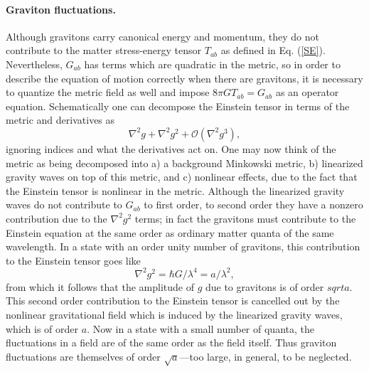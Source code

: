 \documentclass{article}
\begin{document}
\paragraph{\textbf{Graviton fluctuations.}}  Although gravitons carry canonical energy and momentum, they do not contribute to the matter stress-energy tensor $T_{ab}$ as defined in Eq. (\ref{SE}).  Nevertheless, $G_{ab}$ has terms which are quadratic in the metric, so in order to describe the equation of motion correctly when there are gravitons, it is necessary to quantize the metric field as well and impose $8\pi G T_{ab} = G_{ab}$ as an operator equation.  Schematically one can decompose the Einstein tensor in terms of the metric and derivatives as
\begin{equation}
\nabla^2 g + \nabla^2 g^2 + \mathcal{O}(\nabla^2 g^3),
\end{equation}
ignoring indices and what the derivatives act on.  One may now think of the metric as being decomposed into a) a background Minkowski metric, b) linearized gravity waves on top of this metric, and c) nonlinear effects, due to the fact that the Einstein tensor is nonlinear in the metric.  Although the linearized gravity waves do not contribute to $G_{ab}$ to first order, to second order they have a nonzero contribution due to the $\nabla^2 g^2$ terms; in fact the gravitons must contribute to the Einstein equation at the same order as ordinary matter quanta of the same wavelength.  In a state with an order unity number of gravitons, this contribution to the Einstein tensor goes like
\begin{equation}
\nabla^2 g^2 = \hbar G / \lambda^4 = a / \lambda^2,
\end{equation}
from which it follows that the amplitude of $g$ due to gravitons is of order $sqrt{a}$.  This second order contribution to the Einstein tensor is cancelled out by the nonlinear gravitational field which is induced by the linearized gravity waves, which is of order $a$.  Now in a state with a small number of quanta, the fluctuations in a field are of the same order as the field itself.  Thus graviton fluctuations are themselves of order $\sqrt{a}$---too large, in general, to be neglected.
\end{document}

